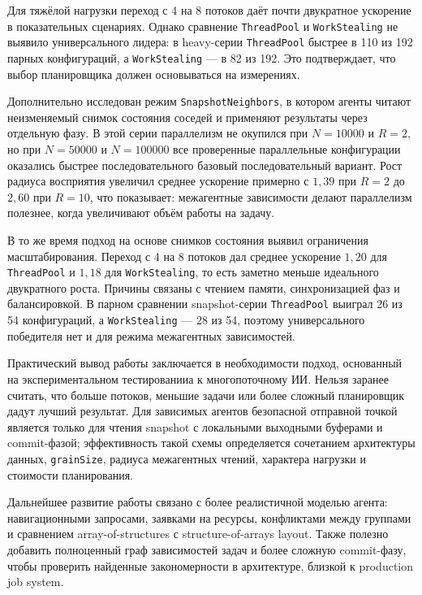 \documentclass[14pt,a4paper,oneside]{extreport}
\begin{document}
Для тяжёлой нагрузки переход с 4 на 8 потоков даёт почти двукратное ускорение в показательных сценариях. Однако сравнение \texttt{ThreadPool} и \texttt{WorkStealing} не выявило универсального лидера: в heavy-серии \texttt{ThreadPool} быстрее в 110 из 192 парных конфигураций, а \texttt{WorkStealing} --- в 82 из 192. Это подтверждает, что выбор планировщика должен основываться на измерениях.

Дополнительно исследован режим \texttt{SnapshotNeighbors}, в котором агенты читают неизменяемый снимок состояния соседей и применяют результаты через отдельную фазу. В этой серии параллелизм не окупился при \(N=10000\) и \(R=2\), но при \(N=50000\) и \(N=100000\) все проверенные параллельные конфигурации оказались быстрее последовательного базовый последовательный вариант. Рост радиуса восприятия увеличил среднее ускорение примерно с \(1{,}39\) при \(R=2\) до \(2{,}60\) при \(R=10\), что показывает: межагентные зависимости делают параллелизм полезнее, когда увеличивают объём работы на задачу.

В то же время подход на основе снимков состояния выявил ограничения масштабирования. Переход с 4 на 8 потоков дал среднее ускорение \(1{,}20\) для \texttt{ThreadPool} и \(1{,}18\) для \texttt{WorkStealing}, то есть заметно меньше идеального двукратного роста. Причины связаны с чтением памяти, синхронизацией фаз и балансировкой. В парном сравнении snapshot-серии \texttt{ThreadPool} выиграл 26 из 54 конфигураций, а \texttt{WorkStealing} --- 28 из 54, поэтому универсального победителя нет и для режима межагентных зависимостей.

Практический вывод работы заключается в необходимости подход, основанный на экспериментальном тестированииа к многопоточному ИИ. Нельзя заранее считать, что больше потоков, меньшие задачи или более сложный планировщик дадут лучший результат. Для зависимых агентов безопасной отправной точкой является только для чтения snapshot с локальными выходными буферами и commit-фазой; эффективность такой схемы определяется сочетанием архитектуры данных, \texttt{grainSize}, радиуса межагентных чтений, характера нагрузки и стоимости планирования.

Дальнейшее развитие работы связано с более реалистичной моделью агента: навигационными запросами, заявками на ресурсы, конфликтами между группами и сравнением array-of-structures с structure-of-arrays layout. Также полезно добавить полноценный граф зависимостей задач и более сложную commit-фазу, чтобы проверить найденные закономерности в архитектуре, близкой к production job system.
\end{document}

